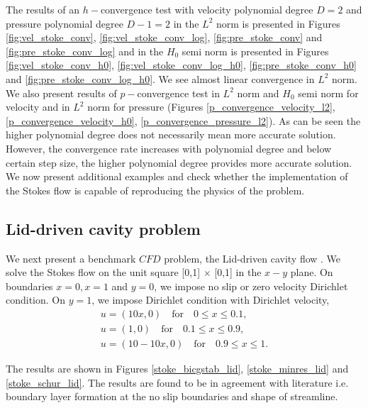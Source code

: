 \documentclass[a4paper,twoside,openright]{book}
\begin{document}
The results of an $h-$convergence test with velocity polynomial degree $D=2$ and pressure polynomial degree $D-1 = 2$ in the $L^2$ norm is presented in Figures \ref{fig:vel_stoke_conv}, \ref{fig:vel_stoke_conv_log}, \ref{fig:pre_stoke_conv} and \ref{fig:pre_stoke_conv_log} and in the $H_0$ semi norm is presented in Figures \ref{fig:vel_stoke_conv_h0}, \ref{fig:vel_stoke_conv_log_h0}, \ref{fig:pre_stoke_conv_h0} and \ref{fig:pre_stoke_conv_log_h0}. We see almost linear convergence in $L^2$ norm. \\

We also present results of $p-$convergence test in $L^2$ norm and $H_0$ semi norm for velocity and in $L^2$ norm for pressure (Figures \ref{p_convergence_velocity_l2}, \ref{p_convergence_velocity_h0}, \ref{p_convergence_pressure_l2}). As can be seen the higher polynomial degree does not necessarily mean more accurate solution. However, the convergence rate increases with polynomial degree and below certain step size, the higher polynomial degree provides more accurate solution.\\

We now present additional examples and check whether the implementation of the Stokes flow is capable of reproducing the physics of the problem.

\subsection{Lid-driven cavity problem} \label{lid_driven_cavity_stokes}

We next present a benchmark $CFD$ problem, the Lid-driven cavity flow \cite{Montlaur2}. We solve the Stokes flow on the unit square [0,1] $\times$ [0,1] in the $x-y$ plane. On boundaries ${x = 0}, {x = 1}$ and ${y = 0}$, we impose no slip or zero velocity Dirichlet condition. On ${y = 1}$, we impose Dirichlet condition with Dirichlet velocity,
\begin{equation}
\begin{split}
u = (10x,0) \quad \textrm{for} \quad 0 \leq x \leq 0.1 \textrm{,}\\
u = (1,0) \quad \textrm{for} \quad 0.1 \leq x \leq 0.9 \textrm{,}\\
u = (10 - 10x,0) \quad \textrm{for} \quad 0.9 \leq x \leq 1 \textrm{.}
\end{split}
\end{equation}

The results are shown in Figures \ref{stoke_bicgstab_lid}, \ref{stoke_minres_lid} and \ref{stoke_schur_lid}. The results are found to be in agreement with literature i.e. boundary layer formation at the no slip boundaries and shape of streamline. 
\end{document}
